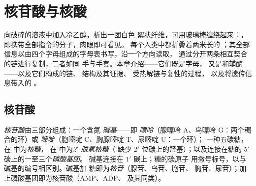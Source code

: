 \chapter{核苷酸与核酸}\label{ch:b1:nucleic-acids}

向破碎的溶液中加入冷乙醇，析出一团白色
絮状纤维，可用玻璃棒缠绕起来：，
即携带全部指令的分子，肉眼即可看见。
每个人类中都折叠着两米长的 ；其全部
信息以由四个字母组成的字母表书写，沿一个方向读取，
通过分开两条相互契合的链进行复制，二者如同
手与手套。本章介绍——它们既是字母，
又是和辅酶——以及它们构成的链、
结构及其证据、 受热解链与复性的过程，
以及将遗传信息带入的 。

\section{核苷酸}

\begin{definition}[核苷酸]\label{def:b1:nucleic-acids:nucleotide}
\emph{核苷酸}由三部分组成：一个含氮
\emph{碱基}——即
\emph{嘌呤}（腺嘌呤 A、鸟嘌呤 G：两个稠合的环）或
\emph{嘧啶}（胞嘧啶 C、胸腺嘧啶 T、尿嘧啶 U：一个环）；
一种五碳糖，在  中为\emph{核糖}，
在  中为\emph{2$'$-脱氧核糖}（
缺少 $2'$ 位碳上的羟基）；以及连接在糖的 $5'$ 碳上的一至三个\emph{磷酸基团}。
碱基连接在 $1'$ 碳上；糖的碳原子
用撇号标号，以与碱基的编号相区别。碱基加
糖即为\emph{核苷}（腺苷、鸟苷、胞苷、
胸苷、尿苷）；加上磷酸基团即为核苷酸（AMP、ADP、
及其同类）。
\end{definition}

